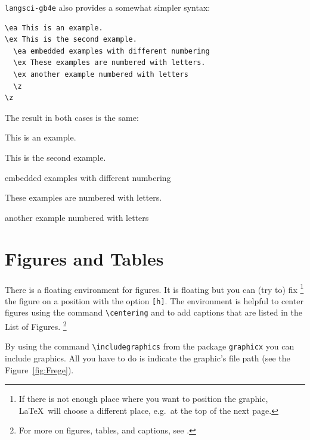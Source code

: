 \noindent \texttt{langsci-gb4e} also provides a somewhat simpler syntax:

\begin{lstlisting}
\ea This is an example.
\ex This is the second example.
  \ea embedded examples with different numbering
  \ex These examples are numbered with letters.
  \ex another example numbered with letters
  \z   
\z
\end{lstlisting}


The result in both cases is the same:

\ea This is an example.

\ex This is the second example.

	\ea embedded examples with different numbering
	
	\ex These examples are numbered with letters.
	
	\ex another example numbered with letters
	\z   
\z


\section{Figures and Tables}
\label{ch:FigTab}


There is a floating environment for figures. It is floating but you can (try to) fix%
	\footnote{If there is not enough place where you want to position the graphic, \LaTeX\ will choose a different place, e.g.\ at the top of the next page.} %
the figure on a position with the option \texttt{[h]}. The environment is helpful to center figures using the command \verb|\centering| and to add captions that are listed in the List of Figures.%
	\footnote{For more on figures, tables, and captions, see \citet{Freitag&MyP15a}.} %

By using the command \verb|\includegraphics| from the package \texttt{graphicx} you can include graphics. All you have to do is indicate the graphic's file path (see the Figure~\ref{fig:Frege}).


